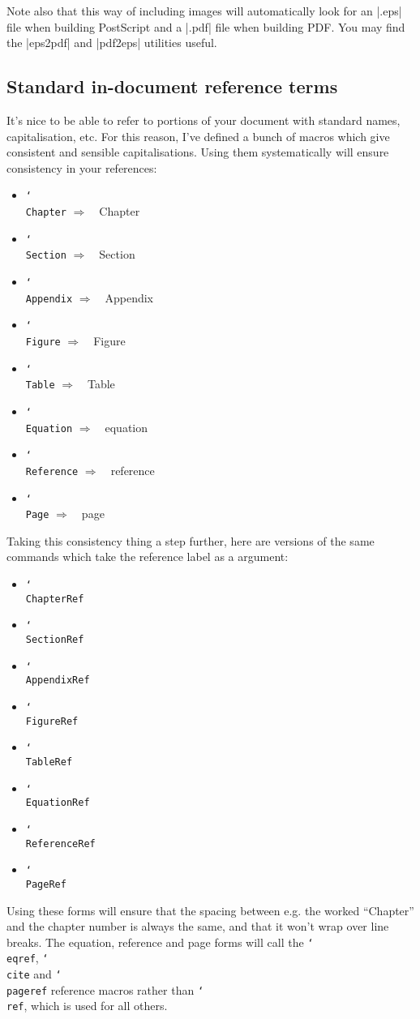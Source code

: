 \documentclass[12pt]{scrartcl}
\newcommand{\manifestsAs}{\texorpdfstring{\ensuremath{\Rightarrow\quad}\xspace}{->}}
\newcommand{\texcmd}[1]{\texorpdfstring{\texttt{\char`\\#1}}{#1}}
\begin{document}
Note also that this way of including images will automatically look for an
|.eps| file when building PostScript and a |.pdf| file when building PDF. You
may find the |eps2pdf| and |pdf2eps| utilities useful.

\subsection{Standard in-document reference terms}
It's nice to be able to refer to portions of your document with standard names,
capitalisation, etc. For this reason, I've defined a bunch of macros which give
consistent and sensible capitalisations. Using them systematically will ensure
consistency in your references:
%
\begin{itemize}
\item \texcmd{Chapter} \manifestsAs Chapter
\item \texcmd{Section} \manifestsAs Section
\item \texcmd{Appendix} \manifestsAs Appendix
\item \texcmd{Figure} \manifestsAs Figure
\item \texcmd{Table} \manifestsAs Table
\item \texcmd{Equation} \manifestsAs equation
\item \texcmd{Reference} \manifestsAs reference
\item \texcmd{Page} \manifestsAs page
\end{itemize}

Taking this consistency thing a step further, here are versions of the same
commands which take the reference label as a argument:
%
\begin{itemize}
\item \texcmd{ChapterRef}
\item \texcmd{SectionRef}
\item \texcmd{AppendixRef}
\item \texcmd{FigureRef}
\item \texcmd{TableRef}
\item \texcmd{EquationRef}
\item \texcmd{ReferenceRef}
\item \texcmd{PageRef}
\end{itemize}
%
Using these forms will ensure that the spacing between e.g. the worked
``Chapter'' and the chapter number is always the same, and that it won't wrap
over line breaks. The equation, reference and page forms will call the
\texcmd{eqref}, \texcmd{cite} and \texcmd{pageref} reference macros rather than
\texcmd{ref}, which is used for all others.
\end{document}

